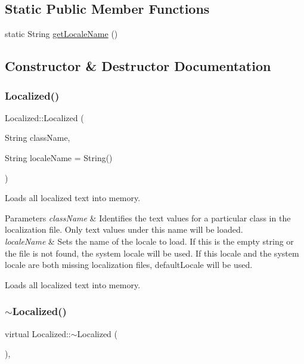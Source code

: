 \subsection*{Static Public Member Functions}
\begin{DoxyCompactItemize}
\item 
static String \mbox{\hyperlink{classLocalized_a5e33dd0e653b9690132d6a477f68a82d}{get\+Locale\+Name}} ()
\end{DoxyCompactItemize}


\subsection{Constructor \& Destructor Documentation}
\mbox{\label{classLocalized_a976882f2fb6f88dfa0368b090fe6568a}} 
\subsubsection{\texorpdfstring{Localized()}{Localized()}}
{\footnotesize\ttfamily Localized\+::\+Localized (\begin{DoxyParamCaption}\item[{String}]{class\+Name,  }\item[{String}]{locale\+Name = {\ttfamily String()} }\end{DoxyParamCaption})}

Loads all localized text into memory.


\begin{DoxyParams}{Parameters}
{\em class\+Name} & Identifies the text values for a particular class in the localization file. Only text values under this name will be loaded.\\
\hline
{\em locale\+Name} & Sets the name of the locale to load. If this is the empty string or the file is not found, the system locale will be used. If this locale and the system locale are both missing localization files, default\+Locale will be used.\\
\hline
\end{DoxyParams}
Loads all localized text into memory. \mbox{\label{classLocalized_a70d3d25b0b0714f5d2e29afc708484f6}} 
\subsubsection{\texorpdfstring{$\sim$\+Localized()}{~Localized()}}
{\footnotesize\ttfamily virtual Localized\+::$\sim$\+Localized (\begin{DoxyParamCaption}{ }\end{DoxyParamCaption})\hspace{0.3cm}{\ttfamily [inline]}, {\ttfamily [virtual]}}



